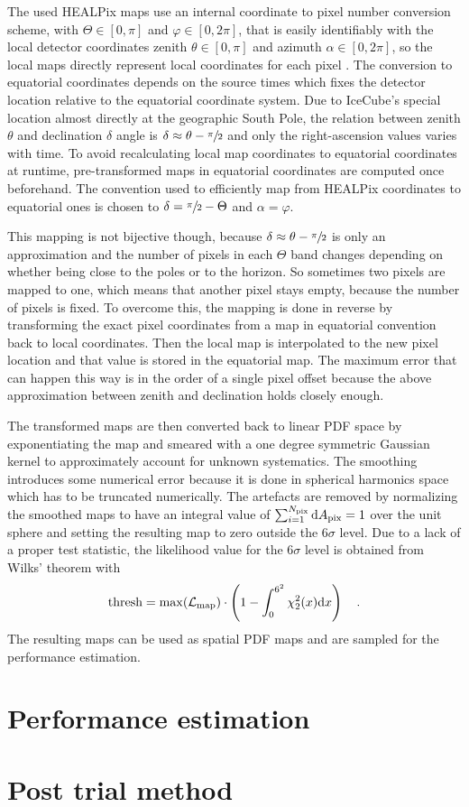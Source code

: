 The used HEALPix maps use an internal coordinate to pixel number conversion scheme, with $\Theta\in[0, \pi]$ and $\varphi\in[0, 2\pi]$, that is easily identifiably with the local detector coordinates zenith $\theta\in[0, \pi]$ and azimuth $\alpha\in[0, 2\pi]$, so the local maps directly represent local coordinates for each pixel .
The conversion to equatorial coordinates depends on the source times which fixes the detector location relative to the equatorial coordinate system.
Due to IceCube's special location almost directly at the geographic South Pole, the relation between zenith $\theta$ and declination $\delta$ angle is $\delta \approx \theta - \sfrac{\pi}{2}$ and only the right-ascension values varies with time.
To avoid recalculating local map coordinates to equatorial coordinates at runtime, pre-transformed maps in equatorial coordinates are computed once beforehand.
The convention used to efficiently map from HEALPix coordinates to equatorial ones is chosen to $\delta = \sfrac{\pi}{2} - \Theta$ and $\alpha = \varphi$.

This mapping is not bijective though, because $\delta \approx \theta - \sfrac{\pi}{2}$ is only an approximation and the number of pixels in each $\Theta$ band changes depending on whether being close to the poles or to the horizon.
So sometimes two pixels are mapped to one, which means that another pixel stays empty, because the number of pixels is fixed.
To overcome this, the mapping is done in reverse by transforming the exact pixel coordinates from a map in equatorial convention back to local coordinates.
Then the local map is interpolated to the new pixel location and that value is stored in the equatorial map.
The maximum error that can happen this way is in the order of a single pixel offset because the above approximation between zenith and declination holds closely enough.

The transformed maps are then converted back to linear PDF space by exponentiating the map and smeared with a one degree symmetric Gaussian kernel to approximately account for unknown systematics.
The smoothing introduces some numerical error because it is done in spherical harmonics space which has to be truncated numerically.
The artefacts are removed by normalizing the smoothed maps to have an integral value of $\sum_{i=1}^{N_\text{pix}} \mathrm{d}A_\text{pix} = 1$ over the unit sphere and setting the resulting map to zero outside the $6\sigma$ level.
Due to a lack of a proper test statistic, the likelihood value for the $6\sigma$ level is obtained from Wilks' theorem with
\begin{equation}
  \text{thresh} =
    \max(\mathcal{L}_\text{map})\cdot
    \left(1 - \int_0^{6^2}\chi^2_{2}(x)\mathrm{d}x\right)
  \quad\text{.}
\end{equation}
The resulting maps can be used as spatial PDF maps and are sampled for the performance estimation.


\section{Performance estimation}


\section{Post trial method}


